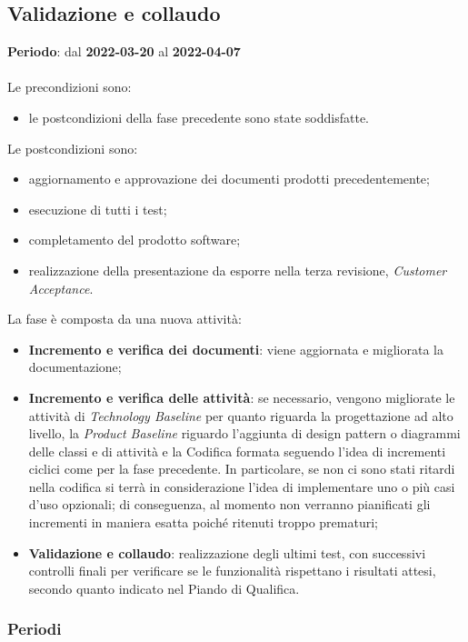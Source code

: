 \subsection{Validazione e collaudo}
\textbf{Periodo}: dal \textbf{2022-03-20} al \textbf{2022-04-07} \mbox{} \\ \mbox{} \\

Le precondizioni sono:
\begin{itemize}
	\item le postcondizioni della fase precedente sono state soddisfatte.
\end{itemize}

Le postcondizioni sono:
\begin{itemize}
	\item aggiornamento e approvazione dei documenti prodotti precedentemente;
	\item esecuzione di tutti i test;
	\item completamento del prodotto software;
	\item realizzazione della presentazione da esporre nella terza revisione, \textit{Customer Acceptance}. 
\end{itemize}

La fase è composta da una nuova attività:
\begin{itemize}
	\item \textbf{Incremento e verifica dei documenti}: viene aggiornata e migliorata la documentazione;
	\item \textbf{Incremento e verifica delle attività}: se necessario, vengono migliorate le attività di \textit{Technology Baseline} per quanto riguarda la progettazione ad alto livello, la \textit{Product Baseline} riguardo l’aggiunta di design pattern o diagrammi delle classi e di attività e la Codifica formata seguendo l’idea di incrementi ciclici come per la fase precedente. In particolare,  se non ci sono stati ritardi nella codifica si terrà in considerazione l’idea di implementare uno o più casi d’uso opzionali; di conseguenza,  al momento non verranno pianificati gli incrementi in maniera esatta poiché ritenuti troppo prematuri;
	\item \textbf{Validazione e collaudo}: realizzazione degli ultimi test, con successivi controlli finali per verificare se le funzionalità rispettano i risultati attesi,  secondo quanto indicato nel Piando di Qualifica.
\end{itemize}

\subsubsection{Periodi}

